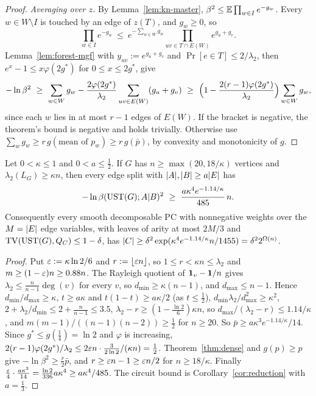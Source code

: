 \begin{proof}
\emph{Averaging over $z$.} By Lemma~\ref{lem:kn-master}, $\beta^2\le\mathbb{E}\prod_{w\in I}e^{-g_w}$. Every $w\in W\setminus I$ is touched by an edge of $z(T)$, and $g_w\ge0$, so
\[
  \prod_{w\in I}e^{-g_w}\ \le\ e^{-\sum_{w\in W}g_w}\prod_{uv\in T\cap E(W)}e^{g_u+g_v} .
\]
Lemma~\ref{lem:forest-mgf} with $y_{uv}:=e^{g_u+g_v}$ and $\Pr[e\in T]\le2/\lambda_2$, then $e^x-1\le x\varphi(2g^*)$ for $0\le x\le2g^*$, give
\[
  -\ln\beta^2\ \ge\ \sum_{w\in W}g_w-\frac{2\varphi(2g^*)}{\lambda_2}\sum_{uv\in E(W)}(g_u+g_v)\ \ge\ \Bigl(1-\frac{2(r-1)\varphi(2g^*)}{\lambda_2}\Bigr)\sum_{w\in W}g_w,
\]
since each $w$ lies in at most $r-1$ edges of $E(W)$. If the bracket is negative, the theorem's bound is negative and holds trivially. Otherwise use $\sum_wg_w\ge r\,g(\text{mean of }p_w)\ge r\,g(\bar p)$, by convexity and monotonicity of $g$.
\end{proof}

\begin{corollary}\label{cor:dense}
Let $0<\kappa\le1$ and $0<a\le\frac12$. If $G$ has $n\ge\max(20,18/\kappa)$ vertices and $\lambda_2(L_G)\ge\kappa n$, then every edge split with $\lvert A\rvert,\lvert B\rvert\ge a\lvert E\rvert$ has
\[
  -\ln\beta(\UST(G);A|B)^2\ \ge\ \frac{a\kappa^4e^{-1.14/\kappa}}{485}\,n .
\]
Consequently every smooth decomposable PC with nonnegative weights over the $M=\lvert E\rvert$ edge variables, with leaves of arity at most $2M/3$ and $\mathrm{TV}(\mathrm{UST}(G),Q_C)\le1-\delta$, has $\lvert C\rvert\ge\delta^2\exp(\kappa^4e^{-1.14/\kappa}n/1455)=\delta^22^{\Omega(n)}$.
\end{corollary}

\begin{proof}
Put $\varepsilon:=\kappa\ln2/6$ and $r:=\lfloor\varepsilon n\rfloor$, so $1\le r<\kappa n\le\lambda_2$ and $m\ge(1-\varepsilon)n\ge0.88n$. The Rayleigh quotient of $\mathbf{1}_v-\mathbf{1}/n$ gives $\lambda_2\le\frac n{n-1}\deg(v)$ for every $v$, so $d_{\min}\ge\kappa(n-1)$, and $d_{\max}\le n-1$. Hence $d_{\min}/d_{\max}\ge\kappa$, $t\ge a\kappa$ and $t(1-t)\ge a\kappa/2$ (as $t\le\frac12$), $d_{\min}\lambda_2/d_{\max}^2\ge\kappa^2$, $2+\lambda_2/d_{\min}\le2+\frac n{n-1}\le3.5$, $\lambda_2-r\ge(1-\frac{\ln2}6)\kappa n$, so $d_{\max}/(\lambda_2-r)\le1.14/\kappa$, and $m(m-1)/((n-1)(n-2))\ge\frac12$ for $n\ge20$. So $\bar p\ge a\kappa^3e^{-1.14/\kappa}/14$. Since $g^*\le g(\frac14)=\ln2$ and $\varphi$ is increasing, $2(r-1)\varphi(2g^*)/\lambda_2\le2\varepsilon n\cdot\frac3{2\ln2}/(\kappa n)=\frac12$. Theorem~\ref{thm:dense} and $g(p)\ge p$ give $-\ln\beta^2\ge\frac r2\bar p$, and $r\ge\varepsilon n-1\ge\varepsilon n/2$ for $n\ge18/\kappa$. Finally $\frac{\varepsilon}4\cdot\frac{a\kappa^3}{14}=\frac{\ln2}{336}a\kappa^4\ge a\kappa^4/485$. The circuit bound is Corollary~\ref{cor:reduction} with $a=\frac13$.
\end{proof}

